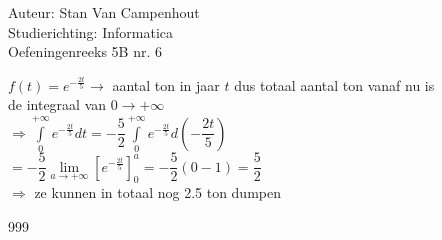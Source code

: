\documentclass[a4paper]{article}
\begin{document}
  
\noindent \large Auteur: Stan Van Campenhout \\
\noindent \large Studierichting:  Informatica\\
\noindent \large Oefeningenreeks 5B nr. 6\\

\medskip

\normalsize

$ f(t) = e^{-\tfrac{2t}{5}} \rightarrow $ aantal ton in jaar $t$ dus totaal aantal ton vanaf nu is \\

de integraal van $ 0 \rightarrow +\infty $\\

$ \Rightarrow \displaystyle\int\limits_0^{+\infty}e^{-\tfrac{2t}{5}}dt =  -\dfrac{5}{2}\displaystyle\int\limits_0^{+\infty}e^{-\tfrac{2t}{5}}d\left(-\dfrac{2t}{5}\right) $\\

$ = -\dfrac{5}{2}\lim\limits_{a\rightarrow+\infty}\left[e^{-\tfrac{2t}{5}}\right]_0^a = -\dfrac{5}{2}\left(0-1\right) = \dfrac{5}{2} $\\

$ \Rightarrow $ ze kunnen in totaal nog 2.5 ton dumpen \\


\begin{thebibliography}{999}
\end{thebibliography}
\end{document}
